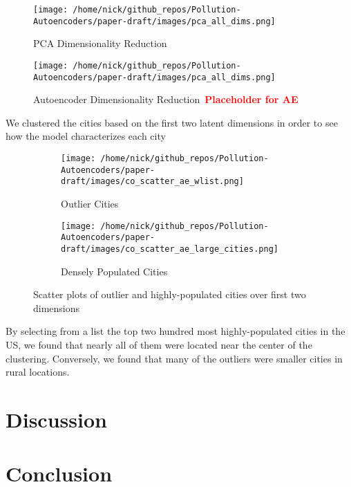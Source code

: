 \documentclass{article}
\newcommand\note[1]{\textbf{\textcolor{red}{#1}}}
\begin{document}
\begin{figure}[h!]
    \texttt{[image: /home/nick/github\_repos/Pollution-Autoencoders/paper-draft/images/pca\_all\_dims.png]} 
    \caption{PCA Dimensionality Reduction}
    \label{fig:ae_dim_reduction}
\end{figure}

\begin{figure}[h!]
    \texttt{[image: /home/nick/github\_repos/Pollution-Autoencoders/paper-draft/images/pca\_all\_dims.png]} 
    \caption{Autoencoder Dimensionality Reduction\ \note{Placeholder for AE}}

    \label{fig:ae_dim_reduction}
\end{figure}

\par We clustered the cities based on the first two latent dimensions in order to see how
the model characterizes each city

\begin{figure}[h!]
\begin{subfigure}{0.5\textwidth}
    \texttt{[image: /home/nick/github\_repos/Pollution-Autoencoders/paper-draft/images/co\_scatter\_ae\_wlist.png]} 
    \caption{Outlier Cities}
    \label{fig:outliers}
\end{subfigure}%
\begin{subfigure}{0.5\textwidth}
    \texttt{[image: /home/nick/github\_repos/Pollution-Autoencoders/paper-draft/images/co\_scatter\_ae\_large\_cities.png]}
    \caption{Densely Populated Cities}
    \label{fig:dense_cities}
\end{subfigure}

\caption{Scatter plots of outlier and highly-populated cities over first two dimensions}
\label{fig:outliers_vs_dense_cities}
\end{figure}

\par By selecting from a list the top two hundred most highly-populated cities in the US, we found that nearly all of them were located near the center of the clustering. Conversely, we found that many of the outliers were smaller cities in rural locations. 

\section{Discussion}

\section{Conclusion}

\printbibliography
\end{document}
